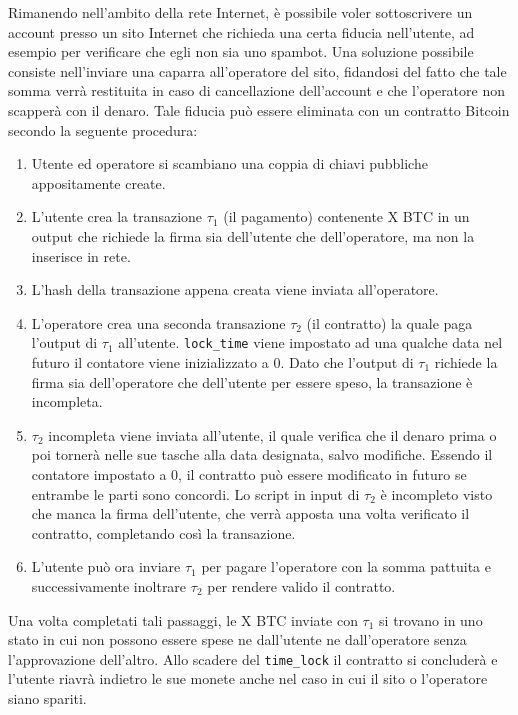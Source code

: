 Rimanendo nell'ambito della rete Internet, è possibile voler sottoscrivere un account presso un sito Internet che richieda una certa fiducia nell'utente, ad esempio per verificare che egli non sia uno spambot. Una soluzione possibile consiste nell'inviare una caparra all'operatore del sito, fidandosi del fatto che tale somma verrà restituita in caso di cancellazione dell'account e che l'operatore non scapperà con il denaro. Tale fiducia può essere eliminata con un contratto Bitcoin secondo la seguente procedura:
\begin{enumerate}
    \item Utente ed operatore si scambiano una coppia di chiavi pubbliche appositamente create.
    \item L'utente crea la transazione $\tau_1$ (il pagamento) contenente X BTC in un output che richiede la firma sia dell'utente che dell'operatore, ma non la inserisce in rete.
    \item L'hash della transazione appena creata viene inviata all'operatore.
    \item L'operatore crea una seconda transazione $\tau_2$ (il contratto) la quale paga l'output di $\tau_1$ all'utente. \verb|lock_time| viene impostato ad una qualche data nel futuro il contatore viene inizializzato a 0. Dato che l'output di $\tau_1$ richiede la firma sia dell'operatore che dell'utente per essere speso, la transazione è incompleta.
    \item $\tau_2$ incompleta viene inviata all'utente, il quale verifica che il denaro prima o poi tornerà nelle sue tasche alla data designata, salvo modifiche. Essendo il contatore impostato a 0, il contratto può essere modificato in futuro se entrambe le parti sono concordi. Lo script in input di $\tau_2$ è incompleto visto che manca la firma dell'utente, che verrà apposta una volta verificato il contratto, completando così la transazione.
    \item L'utente può ora inviare $\tau_1$ per pagare l'operatore con la somma pattuita e successivamente inoltrare $\tau_2$ per rendere valido il contratto.
\end{enumerate}

Una volta completati tali passaggi, le X BTC inviate con $\tau_1$ si trovano in uno stato in cui non possono essere spese ne dall'utente ne dall'operatore senza l'approvazione dell'altro. Allo scadere del \verb|time_lock| il contratto si concluderà e l'utente riavrà indietro le sue monete anche nel caso in cui il sito o l'operatore siano spariti.\\

